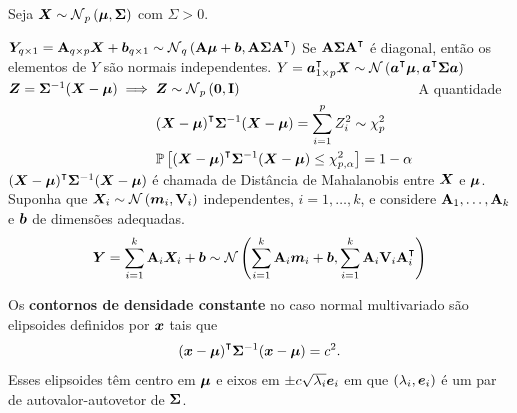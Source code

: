 \begin{theorem}[Transformações]
	Seja $\v{X} \sim \normdist[p]{\v{\mu}, \m{\Sigma}}$ com $\Sigma > 0$.
	\begin{outline}[enumerate]
		\1 \( \v{Y}_{q \times 1} = \m{A}_{q \times p}\v{X}+\v{b}_{q \times 1} \sim \normdist[q]{\m{A}\v{\mu}+\v{b}, \m{A}\m{\Sigma}\m{A}\T}\)
			\2 Se $\m{A}\m{\Sigma}\m{A}\T$ é diagonal, então os elementos de $Y$ são normais independentes.
		\1 \( Y = \v{a}_{1 \times p}\T\v{X} \sim \normdist{\v{a}\T\v{\mu}, \v{a}\T\m{\Sigma}\v{a}} \)
		\1 \( \v{Z} = \m{\Sigma}\inv(\v{X}-\v{\mu}) \implies 
		\begin{aligned}[t]
			&\v{Z} \sim \normdist[p]{\v{0}, \m{I}} \\
			&(\v{X}-\v{\mu})\T\m{\Sigma}\inv(\v{X}-\v{\mu}) = \sum_{i=1}^p Z_i^2 \sim \chidist{p} \\
			&\P\left[(\v{X}-\v{\mu})\T\m{\Sigma}\inv(\v{X}-\v{\mu}) \leq \chidist{p,\alpha}\right] = 1-\alpha
		\end{aligned} \)
			\2 A quantidade $(\v{X}-\v{\mu})\T\m{\Sigma}\inv(\v{X}-\v{\mu})$ é chamada de Distância de Mahalanobis entre $\bm{X}$ e $\bm{\mu}$.
		\1 Suponha que $\v{X}_i \sim \normdist{\v{m}_i, \m{V}_i}$ independentes, $i=1,\ldots,k$, e considere $\mathbf{A}_1, \ldots, \mathbf{A}_k$ e $\bm{b}$ de dimensões adequadas.
			\begin{equation}
				\v{Y}=\sum_{i=1}^{k}\m{A}_i\v{X}_i+\v{b} \sim \normdist{\sum_{i=1}^{k}\m{A}_i\v{m}_i + \v{b}, \sum_{i=1}^{k}\m{A}_i\m{V}_i\m{A}_i\T}
		\end{equation}
	\end{outline}
\end{theorem}

\begin{theorem}[Propriedade]
	Os \textbf{contornos de densidade constante} no caso normal multivariado são elipsoides definidos por $\bm{x}$ tais que
	\begin{equation}
		(\v{x}-\v{\mu})\T\m{\Sigma}^{-1}(\v{x}-\v{\mu}) = c^2.
	\end{equation}
	Esses elipsoides têm centro em $\bm{\mu}$ e eixos em $\pm c\sqrt{\lambda_i}\bm{e}_i$ em que $(\lambda_i,\bm{e}_i)$ é um par de autovalor-autovetor de $\mathbf{\Sigma}$.
\end{theorem}

